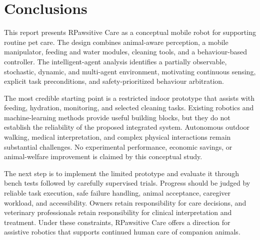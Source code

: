 \documentclass[conference,letterpaper]{IEEEtran}
\begin{document}
\balance
\section{Conclusions}

This report presents RPawsitive Care as a conceptual mobile robot for supporting routine pet care. The design combines animal-aware perception, a mobile manipulator, feeding and water modules, cleaning tools, and a behaviour-based controller. The intelligent-agent analysis identifies a partially observable, stochastic, dynamic, and multi-agent environment, motivating continuous sensing, explicit task preconditions, and safety-prioritized behaviour arbitration.

The most credible starting point is a restricted indoor prototype that assists with feeding, hydration, monitoring, and selected cleaning tasks. Existing robotics and machine-learning methods provide useful building blocks, but they do not establish the reliability of the proposed integrated system. Autonomous outdoor walking, medical interpretation, and complex physical interactions remain substantial challenges. No experimental performance, economic savings, or animal-welfare improvement is claimed by this conceptual study.

The next step is to implement the limited prototype and evaluate it through bench tests followed by carefully supervised trials. Progress should be judged by reliable task execution, safe failure handling, animal acceptance, caregiver workload, and accessibility. Owners retain responsibility for care decisions, and veterinary professionals retain responsibility for clinical interpretation and treatment. Under these constraints, RPawsitive Care offers a direction for assistive robotics that supports continued human care of companion animals.
\end{document}
